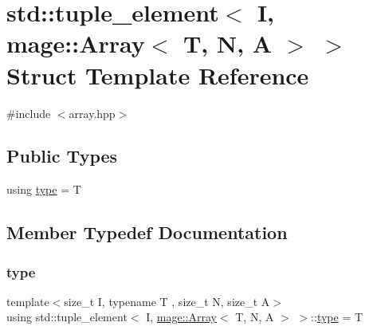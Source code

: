 \hypertarget{structstd_1_1tuple__element_3_01_i_00_01mage_1_1_array_3_01_t_00_01_n_00_01_a_01_4_01_4}{}\section{std\+:\+:tuple\+\_\+element$<$ I, mage\+:\+:Array$<$ T, N, A $>$ $>$ Struct Template Reference}
\label{structstd_1_1tuple__element_3_01_i_00_01mage_1_1_array_3_01_t_00_01_n_00_01_a_01_4_01_4}


{\ttfamily \#include $<$array.\+hpp$>$}

\subsection*{Public Types}
\begin{DoxyCompactItemize}
\item 
using \mbox{\hyperlink{structstd_1_1tuple__element_3_01_i_00_01mage_1_1_array_3_01_t_00_01_n_00_01_a_01_4_01_4_a6e43e3b0b102494c884ca2fd73274140}{type}} = T
\end{DoxyCompactItemize}


\subsection{Member Typedef Documentation}
\mbox{\label{structstd_1_1tuple__element_3_01_i_00_01mage_1_1_array_3_01_t_00_01_n_00_01_a_01_4_01_4_a6e43e3b0b102494c884ca2fd73274140}} 
\subsubsection{\texorpdfstring{type}{type}}
{\footnotesize\ttfamily template$<$size\+\_\+t I, typename T , size\+\_\+t N, size\+\_\+t A$>$ \\
using std\+::tuple\+\_\+element$<$ I, \mbox{\hyperlink{structmage_1_1_array}{mage\+::\+Array}}$<$ T, N, A $>$ $>$\+::\mbox{\hyperlink{structstd_1_1tuple__element_3_01_i_00_01mage_1_1_array_3_01_t_00_01_n_00_01_a_01_4_01_4_a6e43e3b0b102494c884ca2fd73274140}{type}} =  T}

